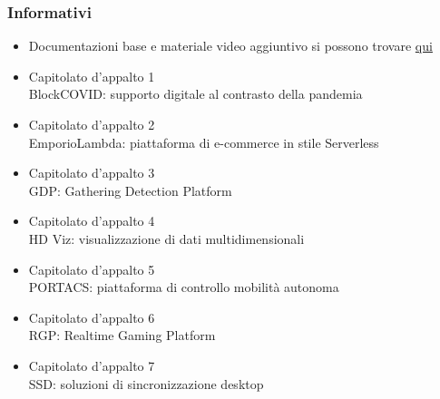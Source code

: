 \subsubsection{Informativi}
\begin{itemize}
  \item Documentazioni base e materiale video aggiuntivo si possono trovare  \href{https://www.math.unipd.it/~tullio/IS-1/2020/Progetto/Capitolati.html}{qui}
  \item Capitolato d'appalto 1 \\
  BlockCOVID: supporto digitale al contrasto della pandemia
  \item Capitolato d'appalto 2 \\
  EmporioLambda: piattaforma di e-commerce in stile Serverless
  \item Capitolato d'appalto 3 \\
  GDP: Gathering Detection Platform
  \item Capitolato d'appalto 4 \\
  HD Viz: visualizzazione di dati multidimensionali
  \item Capitolato d'appalto 5 \\
  PORTACS: piattaforma di controllo mobilità autonoma
  \item Capitolato d'appalto 6 \\
  RGP: Realtime Gaming Platform
  \item Capitolato d'appalto 7 \\
  SSD: soluzioni di sincronizzazione desktop
\end{itemize}